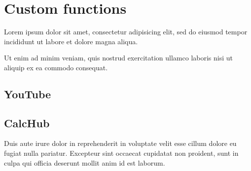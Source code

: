 
\chapter{Custom functions}
Lorem ipsum dolor sit amet, consectetur adipisicing elit, sed do eiusmod tempor incididunt ut labore et dolore magna aliqua.

Ut enim ad minim veniam, quis nostrud exercitation ullamco laboris nisi ut aliquip ex ea commodo consequat.

\section{YouTube}


\section{CalcHub}

Duis aute irure dolor in reprehenderit in voluptate velit esse cillum dolore eu fugiat nulla pariatur. Excepteur sint occaecat cupidatat non proident, sunt in culpa qui officia deserunt mollit anim id est laborum. 


